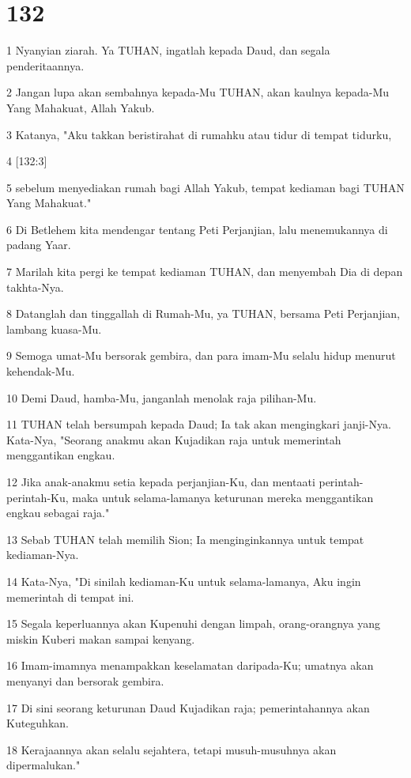 \chapter{132}

\par 1 Nyanyian ziarah. Ya TUHAN, ingatlah kepada Daud, dan segala penderitaannya.
\par 2 Jangan lupa akan sembahnya kepada-Mu TUHAN, akan kaulnya kepada-Mu Yang Mahakuat, Allah Yakub.
\par 3 Katanya, "Aku takkan beristirahat di rumahku atau tidur di tempat tidurku,
\par 4 [132:3]
\par 5 sebelum menyediakan rumah bagi Allah Yakub, tempat kediaman bagi TUHAN Yang Mahakuat."
\par 6 Di Betlehem kita mendengar tentang Peti Perjanjian, lalu menemukannya di padang Yaar.
\par 7 Marilah kita pergi ke tempat kediaman TUHAN, dan menyembah Dia di depan takhta-Nya.
\par 8 Datanglah dan tinggallah di Rumah-Mu, ya TUHAN, bersama Peti Perjanjian, lambang kuasa-Mu.
\par 9 Semoga umat-Mu bersorak gembira, dan para imam-Mu selalu hidup menurut kehendak-Mu.
\par 10 Demi Daud, hamba-Mu, janganlah menolak raja pilihan-Mu.
\par 11 TUHAN telah bersumpah kepada Daud; Ia tak akan mengingkari janji-Nya. Kata-Nya, "Seorang anakmu akan Kujadikan raja untuk memerintah menggantikan engkau.
\par 12 Jika anak-anakmu setia kepada perjanjian-Ku, dan mentaati perintah-perintah-Ku, maka untuk selama-lamanya keturunan mereka menggantikan engkau sebagai raja."
\par 13 Sebab TUHAN telah memilih Sion; Ia menginginkannya untuk tempat kediaman-Nya.
\par 14 Kata-Nya, "Di sinilah kediaman-Ku untuk selama-lamanya, Aku ingin memerintah di tempat ini.
\par 15 Segala keperluannya akan Kupenuhi dengan limpah, orang-orangnya yang miskin Kuberi makan sampai kenyang.
\par 16 Imam-imamnya menampakkan keselamatan daripada-Ku; umatnya akan menyanyi dan bersorak gembira.
\par 17 Di sini seorang keturunan Daud Kujadikan raja; pemerintahannya akan Kuteguhkan.
\par 18 Kerajaannya akan selalu sejahtera, tetapi musuh-musuhnya akan dipermalukan."

